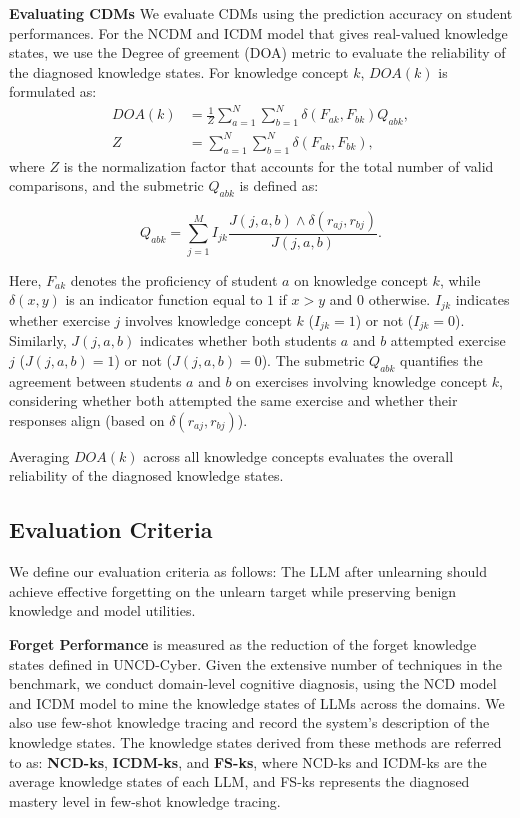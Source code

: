 \noindent \textbf{Evaluating CDMs}
\label{evaluate CDMs}
We evaluate CDMs using the prediction accuracy on student performances. For the NCDM and ICDM model that gives real-valued knowledge states, we use the Degree of greement (DOA) metric \citep{fouss2007random} to evaluate the reliability of the diagnosed knowledge states.
For knowledge concept \(k\), \(DOA(k)\) is formulated as:
\[
\begin{aligned}
DOA(k) &= \frac{1}{Z} \sum_{a=1}^{N}\sum_{b=1}^{N} \delta(F_{ak},F_{bk}) Q_{abk}, \\
Z &= \sum_{a=1}^{N}\sum_{b=1}^{N} \delta(F_{ak},F_{bk}),
\end{aligned}
\]
where \(Z\) is the normalization factor that accounts for the total number of valid comparisons, and the submetric \(Q_{abk}\) is defined as:

\[
Q_{abk} = \sum_{j=1}^{M} I_{jk} 
\frac{J(j,a,b) \land \delta(r_{aj},r_{bj})}{J(j,a,b)}.
\]

Here, \(F_{ak}\) denotes the proficiency of student \(a\) on knowledge concept \(k\), while \(\delta(x,y)\) is an indicator function equal to \(1\) if \(x > y\) and \(0\) otherwise. \(I_{jk}\) indicates whether exercise \(j\) involves knowledge concept \(k\) (\(I_{jk} = 1\)) or not (\(I_{jk} = 0\)). Similarly, \(J(j, a, b)\) indicates whether both students \(a\) and \(b\) attempted exercise \(j\) (\(J(j, a, b) = 1\)) or not (\(J(j, a, b) = 0\)). The submetric \(Q_{abk}\) quantifies the agreement between students \(a\) and \(b\) on exercises involving knowledge concept \(k\), considering whether both attempted the same exercise and whether their responses align (based on \(\delta(r_{aj}, r_{bj})\)).

Averaging \(DOA(k)\) across all knowledge concepts evaluates the overall reliability of the diagnosed knowledge states.




\subsection{Evaluation Criteria}
\label{appendix:evaluation criteria}
We define our evaluation criteria as follows: The LLM after unlearning should achieve effective forgetting on the unlearn target while preserving benign knowledge and model utilities. 

\noindent \textbf{Forget Performance} is measured as the reduction of the forget knowledge states defined in UNCD-Cyber. Given the extensive number of techniques in the benchmark, we conduct domain-level cognitive diagnosis, using the NCD model and ICDM model to mine the knowledge states of LLMs across the domains. We also use few-shot knowledge tracing and record the system's description of the knowledge states. The knowledge states derived from these methods are referred to as: \textbf{NCD-ks}, \textbf{ICDM-ks}, and \textbf{FS-ks}, where NCD-ks and ICDM-ks are the average knowledge states of each LLM, and FS-ks represents the diagnosed mastery level in few-shot knowledge tracing. 

